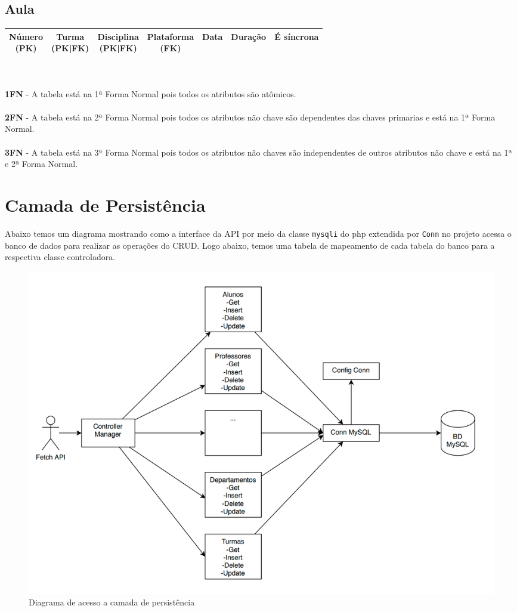\documentclass[12pt]{article}
\begin{document}
\subsection*{Aula}
\begin{tabular}{|c|c|c|c|c|c|c|}
    \hline
    \makecell{Número \\(PK)} & \makecell{Turma \\(PK|FK)} & \makecell{Disciplina \\(PK|FK)} & \makecell{Plataforma \\(FK)} & Data & Duração & É síncrona \\
    \hline
\end{tabular}
\\
\\
\textbf{1FN} - A tabela está na 1ª Forma Normal pois todos os atributos são atômicos. \\
\\
\textbf{2FN} - A tabela está na 2ª Forma Normal pois todos os atributos não chave são dependentes das chaves primarias e está na 1ª Forma Normal. \\
\\
\textbf{3FN} - A tabela está na 3ª Forma Normal pois todos os atributos não chaves são independentes de outros atributos não chave e está na 1ª e 2ª Forma Normal.

\newpage

\section*{Camada de Persistência}
Abaixo temos um diagrama mostrando como a interface da API por meio da classe \texttt{mysqli} do php extendida por \texttt{Conn} no projeto acessa o banco de dados para realizar as operações do CRUD. Logo abaixo, temos uma tabela de mapeamento de cada tabela do banco para a respectiva classe controladora.

\begin{figure}[H]
    \centering
    \includegraphics[width=1\textwidth]{diagrama_persistencia.png}
    \caption{Diagrama de acesso a camada de persistência}
\end{figure}
\end{document}
